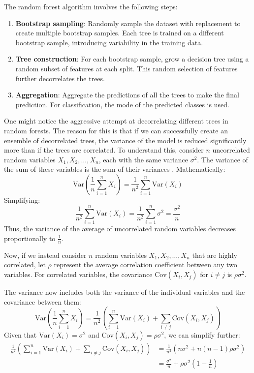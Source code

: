 \documentclass[english,11pt,a4paper,titlepage]{article}
\begin{document}
	The random forest algorithm involves the following steps:
	\begin{enumerate}
		\item \textbf{Bootstrap sampling}: Randomly sample the dataset with replacement to create multiple bootstrap samples. Each tree is trained on a different bootstrap sample, introducing variability in the training data.
		\item \textbf{Tree construction}: For each bootstrap sample, grow a decision tree using a random subset of features at each split. This random selection of features further decorrelates the trees.
		\item \textbf{Aggregation}: Aggregate the predictions of all the trees to make the final prediction. For classification, the mode of the predicted classes is used.
	\end{enumerate}
	
	One might notice the aggressive attempt at decorrelating different trees in random forests. The reason for this is that if we can successfully create an ensemble of decorrelated trees, the variance of the model is reduced significantly more than if the trees are correlated. To understand this, consider \( n \) uncorrelated random variables \( X_1, X_2, \ldots, X_n \), each with the same variance \( \sigma^2 \). The variance of the sum of these variables is the sum of their variances \cite{moodIntroductionTheoryStatistics1973}. Mathematically:
	\begin{equation*}
		\text{Var}\left(\frac{1}{n} \sum_{i=1}^{n} X_i \right) = \frac{1}{n^2} \sum_{i=1}^{n} \text{Var}(X_i)
	\end{equation*}
	Simplifying:
	\begin{equation*}
		\frac{1}{n^2} \sum_{i=1}^{n} \text{Var}(X_i) = \frac{1}{n^2} \sum_{i=1}^{n} \sigma^2 = \frac{\sigma^2}{n}
	\end{equation*}
	Thus, the variance of the average of uncorrelated random variables decreases proportionally to \( \frac{1}{n} \).
	
	Now, if we instead consider \( n \) random variables \( X_1, X_2, \ldots, X_n \) that are highly correlated, let \( \rho \) represent the average correlation coefficient between any two variables.  For correlated variables, the covariance \( \text{Cov}(X_i, X_j) \) for \( i \neq j \) is \( \rho \sigma^2 \). 
	
	The variance now includes both the variance of the individual variables and the covariance between them:
	\begin{equation*}
		\text{Var}\left(\frac{1}{n}\sum_{i=1}^{n}X_i\right) = \frac{1}{n^2} \left(\sum_{i=1}^{n} \text{Var}(X_i) + \sum_{i \neq j} \text{Cov}(X_i, X_j)\right)
	\end{equation*}
	Given that \( \text{Var}(X_i) = \sigma^2 \) and \( \text{Cov}(X_i, X_j) = \rho \sigma^2 \), we can simplify further:
	\begin{align*}
		\frac{1}{n^2} \left(\sum_{i=1}^{n} \text{Var}(X_i) + \sum_{i \neq j} \text{Cov}(X_i, X_j)\right) &= \frac{1}{n^2}(n\sigma^2 + n(n-1)\rho\sigma^2) \\
		&= \frac{\sigma^2}{n} + \rho\sigma^2\left(1 - \frac{1}{n}\right)
	\end{align*}
	
\end{document}
